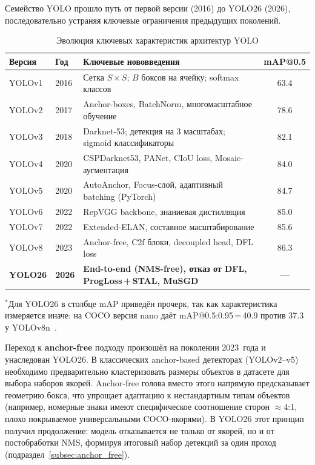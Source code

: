 \documentclass[10pt,a4paper]{report}
\numberwithin{equation}{chapter}
\numberwithin{figure}{chapter}
\numberwithin{table}{chapter}
\begin{document}
Семейство YOLO прошло путь от первой версии (2016) до YOLO26 (2026),
последовательно устраняя ключевые ограничения предыдущих поколений.

\begin{table}[H]
\centering
\caption{Эволюция ключевых характеристик архитектур YOLO}
\label{tab:yolo_evolution}
\begin{tabularx}{\textwidth}{llXc}
\toprule
\textbf{Версия} & \textbf{Год} & \textbf{Ключевые нововведения} & \textbf{mAP@0.5} \\
\midrule
YOLOv1  & 2016 & Сетка $S\!\times\!S$; $B$ боксов на ячейку; softmax классов & 63.4 \\
YOLOv2  & 2017 & Anchor-boxes, BatchNorm, многомасштабное обучение & 78.6 \\
YOLOv3  & 2018 & Darknet-53; детекция на 3 масштабах; sigmoid классификаторы & 82.1 \\
YOLOv4  & 2020 & CSPDarknet53, PANet, CIoU loss, Mosaic-аугментация & 84.0 \\
YOLOv5  & 2020 & AutoAnchor, Focus-слой, адаптивный batching (PyTorch) & 84.7 \\
YOLOv6  & 2022 & RepVGG backbone, знаниевая дистилляция & 85.0 \\
YOLOv7  & 2022 & Extended-ELAN, составное масштабирование & 85.6 \\
YOLOv8  & 2023 & Anchor-free, C2f блоки, decoupled head, DFL loss & 86.3 \\
\textbf{YOLO26} & \textbf{2026} & \textbf{End-to-end (NMS-free), отказ от DFL, ProgLoss\,+\,STAL, MuSGD} & \textbf{---} \\
\bottomrule
\end{tabularx}
\end{table}

\noindent$^{*}$Для YOLO26 в столбце mAP приведён прочерк, так как
характеристика измеряется иначе: на COCO версия nano даёт
mAP@0.5:0.95\,=\,40.9 против 37.3 у YOLOv8n~\cite{yolo26}.

Переход к \textbf{anchor-free} подходу произошёл на поколении 2023~года
и унаследован YOLO26. В классических anchor-based детекторах (YOLOv2--v5)
необходимо предварительно кластеризовать размеры объектов в датасете для
выбора наборов якорей. Anchor-free голова вместо этого напрямую
предсказывает геометрию бокса, что упрощает адаптацию к нестандартным
типам объектов (например, номерные знаки имеют специфическое соотношение сторон
$\approx$4:1, плохо покрываемое универсальными COCO-якорями). В YOLO26
этот принцип получил продолжение: модель отказывается не только от
якорей, но и от постобработки NMS, формируя итоговый набор детекций за
один проход (подраздел~\ref{subsec:anchor_free}).
\end{document}
